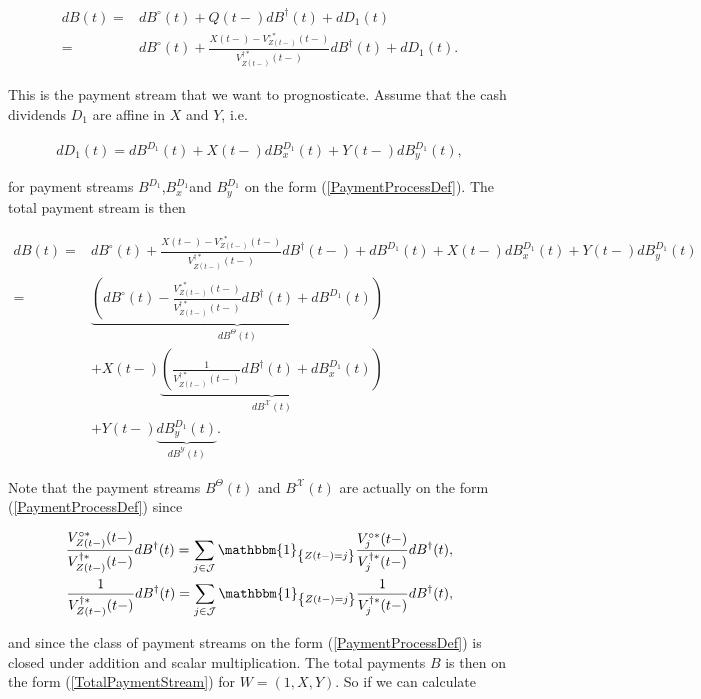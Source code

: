 \documentclass{article}
\newcommand{\1}[1]{\mathbbm{1}_{\left\lbrace #1 \right\rbrace}}
\theoremstyle{break}
\theoremstyle{remark}
\numberwithin{equation}{section}
\begin{document}
\begin{align*}
dB(t) =& dB^\circ(t) + Q(t-) dB^\dagger(t) + dD_1(t)\\
=& dB^\circ(t) + \frac{X(t-) - V_{Z(t-)}^{\circ*}(t-)}{V_{Z(t-)}^{\dagger*}(t-)} dB^\dagger(t) + dD_1(t).
\end{align*}

This is the payment stream that we want to prognosticate. Assume that the cash dividends $D_1$ are affine in $X$ and $Y$, i.e.

\begin{align} \label{LinearCashDiv}
dD_1(t) = dB^{D_1}(t) + X(t-) dB_x^{D_1}(t) + Y(t-)dB_y^{D_1}(t),
\end{align}

for payment streams $B^{D_1}$,$B_x^{D_1}$and $B_y^{D_1}$ on the form (\ref{PaymentProcessDef}). The total payment stream is then

\begin{align}
dB(t) =& dB^\circ(t) + \frac{X(t-) - V_{Z(t-)}^{\circ*}(t-)}{V_{Z(t-)}^{\dagger*}(t-)} dB^\dagger(t-) + dB^{D_1}(t) + X(t-) dB_x^{D_1}(t) + Y(t-) dB_y^{D_1}(t) \nonumber \\
=& \underbrace{\left( dB^\circ(t) - \frac{V_{Z(t-)}^{\circ*}(t-)}{V_{Z(t-)}^{\dagger*}(t-)} dB^\dagger(t) + dB^{D_1}(t) \right)}_{dB^\Theta(t)} \label{FirstLine} \\
&+ X(t-) \underbrace{\left( \frac{1}{V_{Z(t-)}^{\dagger*}(t-)} dB^\dagger(t) + dB_x^{D_1}(t) \right)}_{dB^\mathcal{X}(t)} \label{SecondLine} \\
&+ Y(t-) \underbrace{dB_y^{D_1}(t)}_{dB^\mathcal{Y}(t)}. \label{ThirdLine}
\end{align}

Note that the payment streams $B^\Theta(t)$ and $B^\mathcal{X}(t)$ are actually on the form (\ref{PaymentProcessDef}) since

\begin{align*}
	\frac{V_{Z(t-)}^{\circ*}(t-)}{V_{Z(t-)}^{\dagger*}(t-)} dB^\dagger(t) = \sum_{j \in \mathcal{J}} \1{Z(t-)=j} \frac{V_{j}^{\circ*}(t-)}{V_{j}^{\dagger*}(t-)} dB^\dagger(t), \\
	\frac{1}{V_{Z(t-)}^{\dagger*}(t-)} dB^\dagger(t) = \sum_{j \in \mathcal{J}} \1{Z(t-)=j} \frac{1}{V_{j}^{\dagger*}(t-)} dB^\dagger(t),
\end{align*}

and since the class of payment streams on the form (\ref{PaymentProcessDef}) is closed under addition and scalar multiplication. The total payments $B$ is then on the form (\ref{TotalPaymentStream}) for $W=(1,X,Y)$. So if we can calculate
	
\end{document}
